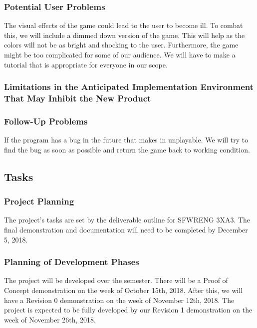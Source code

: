 \documentclass[12pt, titlepage]{article}
\begin{document}
\subsubsection{Potential User Problems}

The visual effects of the game could lead to the user to become ill. To combat this, we will include a dimmed down version of the game. This will help as the colors will not be as bright and shocking to the user. Furthermore, the game might be too complicated for some of our audience. We will have to make a tutorial that is appropriate for everyone in our scope.

\subsubsection{Limitations in the Anticipated Implementation Environment That May Inhibit the New Product}

\subsubsection{Follow-Up Problems}

If the program has a bug in the future that makes in unplayable. We will try to find the bug as soon as possible and return the game back to working condition.

\subsection{Tasks}
\subsubsection{Project Planning}

The project's tasks are set by the deliverable outline for SFWRENG 3XA3. The final demonstration and documentation will need to be completed by December 5, 2018.

\subsubsection{Planning of Development Phases}

The project will be developed over the semester. There will be a Proof of Concept demonstration on the week of October 15th, 2018. After this, we will have a Revision 0 demonstration on the week of November 12th, 2018. The project is expected to be fully developed by our Revision 1 demonstration on the week of November 26th, 2018.
\end{document}
